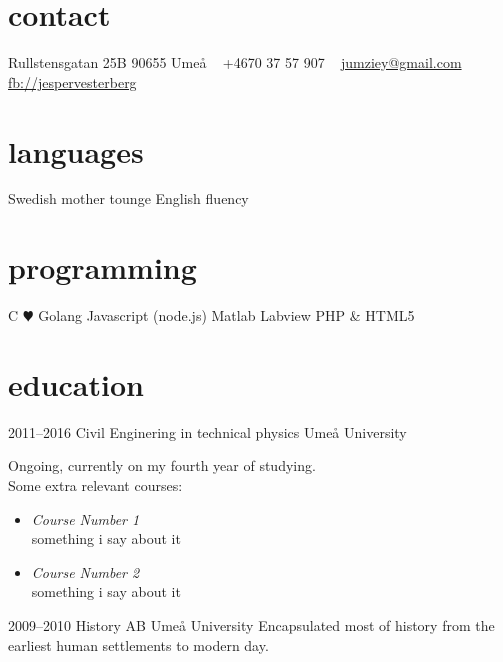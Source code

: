 \documentclass[]{friggeri-cv} %
\begin{document}


\begin{aside} %
\section{contact}
Rullstensgatan 25B
90655 Umeå
~
+4670 37 57 907
~
\href{mailto:jumziey@gmail.com}{jumziey@gmail.com}
\href{https://www.facebook.com/jesper.vesterberlg}{fb://jespervesterberg}
\section{languages}
Swedish mother tounge
English fluency
\section{programming}
C{\color{red} $\varheartsuit$}
Golang
Javascript (node.js)
Matlab
Labview
PHP \& HTML5
\end{aside}


\section{education}

\begin{entrylist}
\entry
{2011--2016}
{Civil Enginering {\normalfont in technical physics}}
{Umeå University}
{Ongoing, currently on my fourth year of studying.\\
Some extra relevant courses: 
\begin{itemize}
\item \emph{Course Number 1} \\
	something i say about it 
\item \emph{Course Number 2} \\
	something i say about it 
\end{itemize}
}
\entry
{2009--2010}
{History {\normalfont AB}}
{Umeå University}
{Encapsulated most of history from the earliest human settlements to modern day.}
\end{entrylist}
\end{document}
